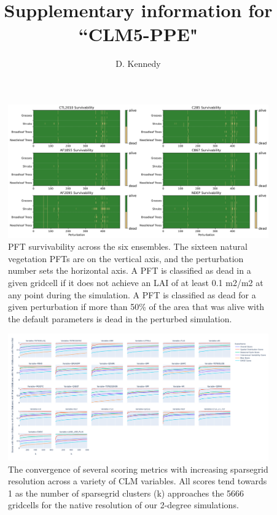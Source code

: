 \documentclass[11pt]{article}
\title{Supplementary information for ``CLM5-PPE"}
\author{D. Kennedy}
\begin{document}
\maketitle


\begin{landscape}
\begin{figure}[h]
\centering
\includegraphics[width=50pc]{figs/supp/survivability.png}
\caption{PFT survivability across the six ensembles. The sixteen natural vegetation PFTs are on the vertical axis, and the perturbation number sets the horizontal axis. A PFT is classified as dead in a given gridcell if it does not achieve an LAI of at least 0.1 m2/m2 at any point during the simulation. A PFT is classified as dead for a given perturbation if more than 50\% of the area that was alive with the default parameters is dead in the perturbed simulation.}
\label{supp:surv}
\end{figure}


\begin{figure}[h]
\centering
\includegraphics[width=60pc]{figs/supp/ilamb_lines.png}
\caption{The convergence of several scoring metrics with increasing sparsegrid resolution across a variety of CLM variables. All scores tend towards 1 as the number of sparsegrid clusters (k) approaches the 5666 gridcells for the native resolution of our 2-degree simulations. }
\label{supp:ilamb}
\end{figure}
\end{landscape}
\end{document}
